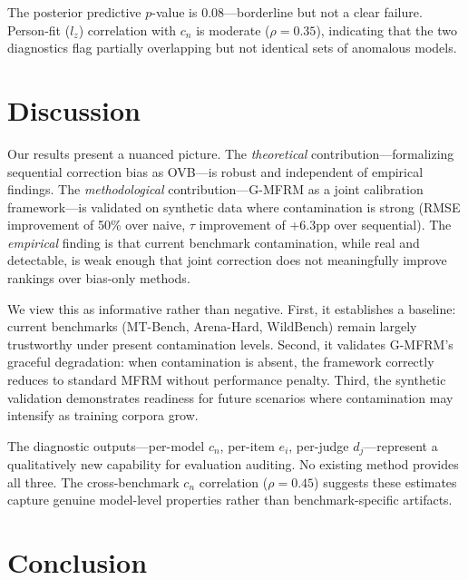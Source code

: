 \documentclass[11pt]{article}
\newcommand{\gmfrm}{G-MFRM}
\newcommand{\cn}{c_n}
\newcommand{\ei}{e_i}
\renewcommand{\dj}{d_j}
\begin{document}
The posterior predictive $p$-value is 0.08---borderline but not a clear failure. Person-fit ($l_z$) correlation with $\cn$ is moderate ($\rho = 0.35$), indicating that the two diagnostics flag partially overlapping but not identical sets of anomalous models.

\section{Discussion}
\label{sec:discussion}

Our results present a nuanced picture. The \emph{theoretical} contribution---formalizing sequential correction bias as OVB---is robust and independent of empirical findings. The \emph{methodological} contribution---\gmfrm{} as a joint calibration framework---is validated on synthetic data where contamination is strong (RMSE improvement of 50\% over naive, $\tau$ improvement of +6.3pp over sequential). The \emph{empirical} finding is that current benchmark contamination, while real and detectable, is weak enough that joint correction does not meaningfully improve rankings over bias-only methods.

We view this as informative rather than negative. First, it establishes a baseline: current benchmarks (MT-Bench, Arena-Hard, WildBench) remain largely trustworthy under present contamination levels. Second, it validates \gmfrm{}'s graceful degradation: when contamination is absent, the framework correctly reduces to standard MFRM without performance penalty. Third, the synthetic validation demonstrates readiness for future scenarios where contamination may intensify as training corpora grow.

The diagnostic outputs---per-model $\cn$, per-item $\ei$, per-judge $\dj$---represent a qualitatively new capability for evaluation auditing. No existing method provides all three. The cross-benchmark $\cn$ correlation ($\rho = 0.45$) suggests these estimates capture genuine model-level properties rather than benchmark-specific artifacts.

\section{Conclusion}
\label{sec:conclusion}
\end{document}
